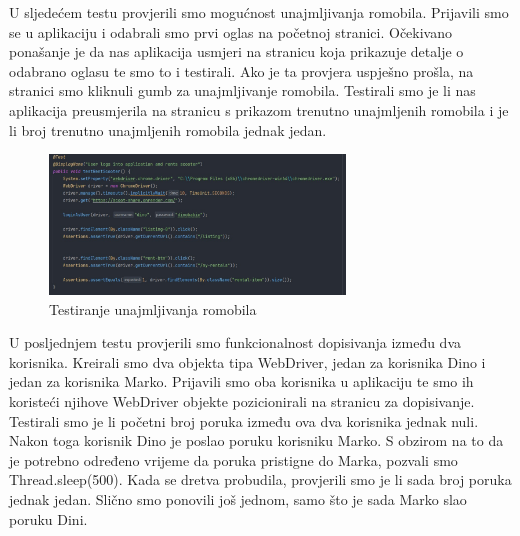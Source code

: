 			 
			 \indent U sljedećem testu provjerili smo mogućnost unajmljivanja romobila. Prijavili smo se u aplikaciju i odabrali smo prvi oglas na početnoj stranici. Očekivano ponašanje je da nas aplikacija usmjeri na stranicu koja prikazuje detalje o odabrano oglasu te smo to i testirali. Ako je ta provjera uspješno prošla, na stranici smo kliknuli gumb za unajmljivanje romobila. Testirali smo je li nas aplikacija preusmjerila  na stranicu s prikazom trenutno unajmljenih romobila i je li broj trenutno unajmljenih romobila jednak jedan.
			 
			 \begin{figure}[h]
			 	\centering
			 	\includegraphics[width=0.7\textwidth]{slike/selenium_test_2.jpg}
			 	\caption{Testiranje unajmljivanja romobila}
			 	\label{fig:Testiranje unajmljivanja romobila}
			 \end{figure}
			 
			 \indent U posljednjem testu provjerili smo funkcionalnost dopisivanja između dva korisnika. Kreirali smo dva objekta tipa WebDriver, jedan za korisnika Dino i jedan za korisnika Marko. Prijavili smo oba korisnika u aplikaciju te smo ih koristeći njihove WebDriver objekte pozicionirali na stranicu za dopisivanje. Testirali smo je li početni broj poruka između ova dva korisnika jednak nuli. Nakon toga korisnik Dino je poslao poruku korisniku Marko. S obzirom na to da je potrebno određeno vrijeme da poruka pristigne do Marka, pozvali smo Thread.sleep(500). Kada se dretva probudila, provjerili smo je li sada broj poruka jednak jedan. Slično smo ponovili još jednom, samo što je sada Marko slao poruku Dini.
			 
